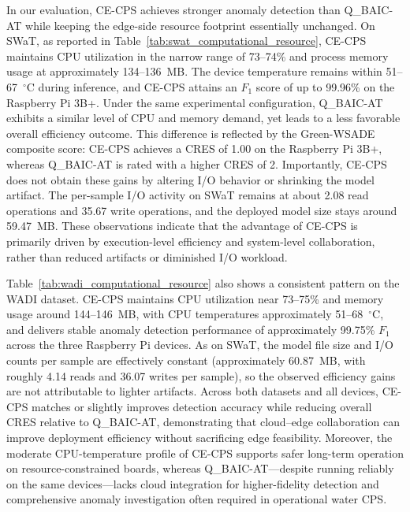 \documentclass[pdflatex,sn-mathphys-num]{sn-jnl}%
\theoremstyle{thmstyleone}
\theoremstyle{thmstyletwo}%
\theoremstyle{thmstylethree}%
\begin{document}
In our evaluation, CE-CPS achieves stronger anomaly detection than Q\_BAIC-AT while keeping the edge-side resource footprint essentially unchanged. On SWaT, as reported in Table~\ref{tab:swat_computational_resource}, CE-CPS maintains CPU utilization in the narrow range of 73--74\% and process memory usage at approximately 134--136~MB. The device temperature remains within 51--67~$^{\circ}\mathrm{C}$ during inference, and CE-CPS attains an $F_{1}$ score of up to 99.96\% on the Raspberry Pi 3B+. Under the same experimental configuration, Q\_BAIC-AT exhibits a similar level of CPU and memory demand, yet leads to a less favorable overall efficiency outcome. This difference is reflected by the Green-WSADE composite score: CE-CPS achieves a CRES of 1.00 on the Raspberry Pi 3B+, whereas Q\_BAIC-AT is rated with a higher CRES of 2. Importantly, CE-CPS does not obtain these gains by altering I/O behavior or shrinking the model artifact. The per-sample I/O activity on SWaT remains at about 2.08 read operations and 35.67 write operations, and the deployed model size stays around 59.47~MB. These observations indicate that the advantage of CE-CPS is primarily driven by execution-level efficiency and system-level collaboration, rather than reduced artifacts or diminished I/O workload.

Table~\ref{tab:wadi_computational_resource} also shows a consistent pattern on the WADI dataset. CE-CPS maintains CPU utilization near 73--75\% and memory usage around 144--146~MB, with CPU temperatures approximately 51--68~$^{\circ}\mathrm{C}$, and delivers stable anomaly detection performance of approximately 99.75\% $F_{1}$ across the three Raspberry Pi devices. As on SWaT, the model file size and I/O counts per sample are effectively constant (approximately 60.87~MB, with roughly 4.14 reads and 36.07 writes per sample), so the observed efficiency gains are not attributable to lighter artifacts. Across both datasets and all devices, CE-CPS matches or slightly improves detection accuracy while reducing overall CRES relative to Q\_BAIC-AT, demonstrating that cloud--edge collaboration can improve deployment efficiency without sacrificing edge feasibility. Moreover, the moderate CPU-temperature profile of CE-CPS supports safer long-term operation on resource-constrained boards, whereas Q\_BAIC-AT---despite running reliably on the same devices---lacks cloud integration for higher-fidelity detection and comprehensive anomaly investigation often required in operational water CPS.
\end{document}
